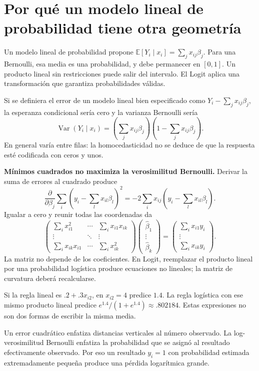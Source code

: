 \documentclass[11pt,a4paper]{article}
\newcommand{\E}{\mathbb E}
\DeclareMathOperator{\Var}{Var}
\begin{document}
\clearpage
\section{Por qué un modelo lineal de probabilidad tiene otra geometría}\label{logit12}
Un modelo lineal de probabilidad propone
$\E[Y_i\mid x_i]=\sum_jx_{ij}\beta_j$.
Para una Bernoulli, esa media es una probabilidad, y debe permanecer
en $[0,1]$. Un producto lineal sin restricciones puede salir del intervalo.
El Logit aplica una transformación que garantiza probabilidades válidas.

Si se definiera el error de un modelo lineal bien especificado como
$Y_i-\sum_jx_{ij}\beta_j$, la esperanza condicional sería cero y
la varianza Bernoulli sería
\[
\Var(Y_i\mid x_i)=
\left(\sum_jx_{ij}\beta_j\right)
\left(1-\sum_jx_{ij}\beta_j\right).
\]
En general varía entre filas: la homocedasticidad no se deduce de
que la respuesta esté codificada con ceros y unos.

\textbf{Mínimos cuadrados no maximiza la verosimilitud Bernoulli.}
Derivar la suma de errores al cuadrado produce
\[
\frac{\partial}{\partial\beta_j}
\sum_i\left(y_i-\sum_lx_{il}\beta_l\right)^2
=-2\sum_i x_{ij}\left(y_i-\sum_lx_{il}\beta_l\right).
\]
Igualar a cero y reunir todas las coordenadas da
\[
\begin{pmatrix}
\sum_i x_{i1}^2&\cdots&\sum_i x_{i1}x_{ik}\\
\vdots&\ddots&\vdots\\
\sum_i x_{ik}x_{i1}&\cdots&\sum_i x_{ik}^2
\end{pmatrix}
\begin{pmatrix}\widehat\beta_1\\\vdots\\\widehat\beta_k\end{pmatrix}
=
\begin{pmatrix}\sum_i x_{i1}y_i\\\vdots\\\sum_i x_{ik}y_i\end{pmatrix}.
\]
La matriz no depende de los coeficientes.
En Logit, reemplazar el producto lineal por una probabilidad logística
produce ecuaciones no lineales; la matriz de curvatura deberá recalcularse.

\begin{ejemplo}
Si la regla lineal es $.2+.3x_{i2}$, en $x_{i2}=4$ predice $1.4$.
La regla logística con ese mismo producto lineal predice
$e^{1.4}/(1+e^{1.4})\approx.802184$.
Estas expresiones no son dos formas de escribir la misma media.
\end{ejemplo}
Un error cuadrático enfatiza distancias verticales al número observado.
La log-verosimilitud Bernoulli enfatiza la probabilidad que se asignó
al resultado efectivamente observado.
Por eso un resultado $y_i=1$ con probabilidad estimada extremadamente
pequeña produce una pérdida logarítmica grande.
\end{document}
